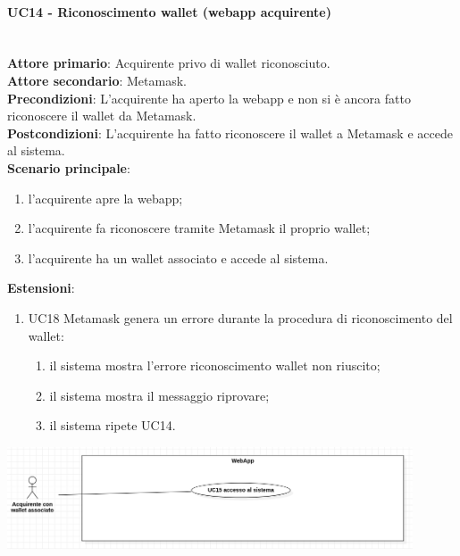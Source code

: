 \documentclass[a4paper, 12pt]{article}
\begin{document}
\paragraph{UC14 - Riconoscimento wallet (webapp acquirente)}\\
\textbf{Attore primario}: Acquirente privo di wallet riconosciuto.\\
\textbf{Attore secondario}: Metamask.\\
\textbf{Precondizioni}: L'acquirente ha aperto la webapp e non si è ancora fatto riconoscere il wallet da Metamask.\\
\textbf{Postcondizioni}: L'acquirente ha fatto riconoscere il wallet a Metamask e accede al sistema.\\
\textbf{Scenario principale}:
\begin{enumerate}
    \item l’acquirente apre la webapp;
    \item l'acquirente fa riconoscere tramite Metamask il proprio wallet;
    \item l’acquirente ha un wallet associato e accede al sistema.
\end{enumerate}
\textbf{Estensioni}:
\begin{enumerate}
    \item UC18 Metamask genera un errore durante la procedura di riconoscimento del wallet:
    \begin{enumerate}
        \item il sistema mostra l'errore riconoscimento wallet non riuscito;
        \item il sistema mostra il messaggio riprovare;
        \item il sistema ripete UC14.
    \end{enumerate}
\end{enumerate}

\includegraphics[width=0.9\textwidth]{UseCase_webapp2}
\end{document}
